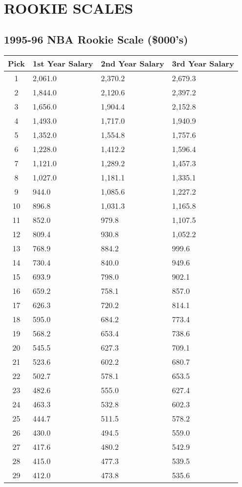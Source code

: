 \documentclass[
]{book}
\begin{document}
\hypertarget{rookie-scales}{%
\chapter{ROOKIE SCALES}\label{rookie-scales}}

\newpage

\hypertarget{nba-rookie-scale-000s}{%
\section{1995-96 NBA Rookie Scale (\$000's)}\label{nba-rookie-scale-000s}}

\begin{longtable}[]{@{}clll@{}}
\toprule()
Pick & 1st Year Salary & 2nd Year Salary & 3rd Year Salary \\
\midrule()
\endhead
1 & 2,061.0 & 2,370.2 & 2,679.3 \\
2 & 1,844.0 & 2,120.6 & 2,397.2 \\
3 & 1,656.0 & 1,904.4 & 2,152.8 \\
4 & 1,493.0 & 1,717.0 & 1,940.9 \\
5 & 1,352.0 & 1,554.8 & 1,757.6 \\
6 & 1,228.0 & 1,412.2 & 1,596.4 \\
7 & 1,121.0 & 1,289.2 & 1,457.3 \\
8 & 1,027.0 & 1,181.1 & 1,335.1 \\
9 & 944.0 & 1,085.6 & 1,227.2 \\
10 & 896.8 & 1,031.3 & 1,165.8 \\
11 & 852.0 & 979.8 & 1,107.5 \\
12 & 809.4 & 930.8 & 1,052.2 \\
13 & 768.9 & 884.2 & 999.6 \\
14 & 730.4 & 840.0 & 949.6 \\
15 & 693.9 & 798.0 & 902.1 \\
16 & 659.2 & 758.1 & 857.0 \\
17 & 626.3 & 720.2 & 814.1 \\
18 & 595.0 & 684.2 & 773.4 \\
19 & 568.2 & 653.4 & 738.6 \\
20 & 545.5 & 627.3 & 709.1 \\
21 & 523.6 & 602.2 & 680.7 \\
22 & 502.7 & 578.1 & 653.5 \\
23 & 482.6 & 555.0 & 627.4 \\
24 & 463.3 & 532.8 & 602.3 \\
25 & 444.7 & 511.5 & 578.2 \\
26 & 430.0 & 494.5 & 559.0 \\
27 & 417.6 & 480.2 & 542.9 \\
28 & 415.0 & 477.3 & 539.5 \\
29 & 412.0 & 473.8 & 535.6 \\
\bottomrule()
\end{longtable}
\end{document}
